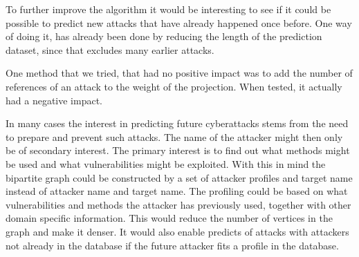 To further improve the algorithm it would be interesting to see if it could be possible to predict new attacks that have already happened once before. One way of doing it, has already been done by reducing the length of the prediction dataset, since that excludes many earlier attacks.

One method that we tried, that had no positive impact was to add the number of references of an attack to the weight of the projection. When tested, it actually had a negative impact.

In many cases the interest in predicting future cyberattacks stems from the need to prepare and prevent such attacks. The name of the attacker might then only be of secondary interest. The primary interest is to find out what methods might be used and what vulnerabilities might be exploited. With this in mind the bipartite graph could be constructed by a set of attacker profiles and target name instead of attacker name and target name. The profiling could be based on what vulnerabilities and methods the attacker has previously used, together with other domain specific information. This would reduce the number of vertices in the graph and make it denser. It would also enable predicts of attacks with attackers not already in the database if the future attacker fits a profile in the database.
